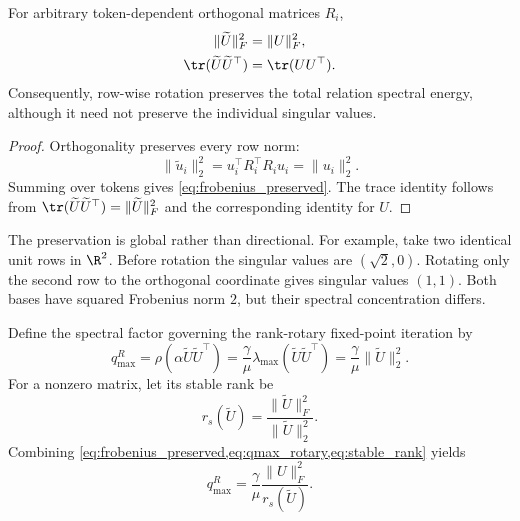 \begin{lemma}
\label{lem:rotation_energy}
For arbitrary token-dependent orthogonal matrices $R_i$,
\begin{align}
  \lVert\widetilde U\rVert_F^2
  &=\lVert U\rVert_F^2,\label{eq:frobenius_preserved}\\
  \tr(\widetilde U\widetilde U^\top)
  &=\tr(UU^\top).\label{eq:trace_preserved}
\end{align}
Consequently, row-wise rotation preserves the total relation spectral energy,
although it need not preserve the individual singular values.
\end{lemma}
\begin{proof}
Orthogonality preserves every row norm:
\[
  \lVert\widetilde u_i\rVert_2^2
  =u_i^\top R_i^\top R_i u_i
  =\lVert u_i\rVert_2^2.
\]
Summing over tokens gives \cref{eq:frobenius_preserved}. The trace identity
follows from
$\tr(\widetilde U\widetilde U^\top)=\lVert\widetilde U\rVert_F^2$
and the corresponding identity for $U$.
\end{proof}

The preservation is global rather than directional. For example, take two
identical unit rows in $\R^2$. Before rotation the singular values are
$(\sqrt{2},0)$. Rotating only the second row to the orthogonal coordinate gives
singular values $(1,1)$. Both bases have squared Frobenius norm $2$, but their
spectral concentration differs.

Define the spectral factor governing the rank-rotary fixed-point iteration by
\begin{equation}
  q_{\max}^{R}
  =\rho(\alpha\widetilde U\widetilde U^\top)
  =\frac{\gamma}{\mu}
   \lambda_{\max}(\widetilde U\widetilde U^\top)
  =\frac{\gamma}{\mu}\lVert\widetilde U\rVert_2^2.
  \label{eq:qmax_rotary}
\end{equation}
For a nonzero matrix, let its stable rank be
\begin{equation}
  r_s(\widetilde U)
  =\frac{\lVert\widetilde U\rVert_F^2}
  {\lVert\widetilde U\rVert_2^2}.
  \label{eq:stable_rank}
\end{equation}
Combining \cref{eq:frobenius_preserved,eq:qmax_rotary,eq:stable_rank} yields
\begin{equation}
  q_{\max}^{R}
  =\frac{\gamma}{\mu}
   \frac{\lVert U\rVert_F^2}{r_s(\widetilde U)}.
  \label{eq:qmax_stable_rank}
\end{equation}

